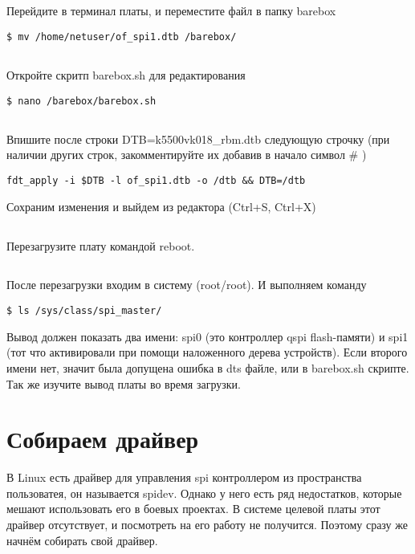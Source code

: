 \subsection{}Перейдите в терминал платы, и переместите файл в папку barebox
\begin{lstlisting}[style=bash]
$ mv /home/netuser/of_spi1.dtb /barebox/
\end{lstlisting}

\subsection{}Откройте скритп barebox.sh для редактирования
\begin{lstlisting}[style=bash]
$ nano /barebox/barebox.sh
\end{lstlisting}

\subsection{}Впишите после строки DTB=k5500vk018\_rbm.dtb следующую строчку (при наличии других строк, закомментируйте их добавив в начало символ \# )
\begin{lstlisting}[style=stdout]
fdt_apply -i $DTB -l of_spi1.dtb -o /dtb && DTB=/dtb
\end{lstlisting}
Сохраним изменения и выйдем из редактора (Ctrl+S, Ctrl+X)

\subsection{}Перезагрузите плату командой reboot. 

\subsection{}После перезагрузки входим в систему (root/root). И выполняем команду
\begin{lstlisting}[style=bash]
$ ls /sys/class/spi_master/
\end{lstlisting}
Вывод должен показать два имени: spi0 (это контроллер qspi flash-памяти) и spi1 (тот что активировали при помощи наложенного дерева устройств). Если второго имени нет, значит была допущена ошибка в dts файле, или в barebox.sh скрипте. Так же изучите вывод платы во время загрузки. 

\section{Собираем драйвер}
В Linux есть драйвер для управления spi контроллером из пространства пользоватея, он называется spidev. Однако у него есть ряд недостатков, которые мешают использовать его в боевых проектах. В системе целевой платы этот драйвер отсутствует, и посмотреть на его работу не получится. Поэтому сразу же начнём собирать свой драйвер.

